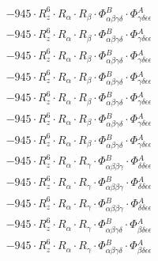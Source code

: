 \documentclass{article}
\begin{document}
\begin{subequations}
\begin{gather}
\begin{array}{c}
 \\[0.2em] 		 - 945 \cdot R_{z}^{6} \cdot R_{\alpha{}} \cdot R_{\beta{}} \cdot \Phi{}^{B}_{\alpha{}\beta{}\gamma{}\delta{}} \cdot \Phi{}^{A}_{\gamma{}\delta{}\epsilon{}\epsilon{}} 
 \\[0.2em] 		 - 945 \cdot R_{z}^{6} \cdot R_{\alpha{}} \cdot R_{\beta{}} \cdot \Phi{}^{B}_{\alpha{}\beta{}\gamma{}\delta{}} \cdot \Phi{}^{A}_{\gamma{}\delta{}\epsilon{}\epsilon{}} 
 \\[0.2em] 		 - 945 \cdot R_{z}^{6} \cdot R_{\alpha{}} \cdot R_{\beta{}} \cdot \Phi{}^{B}_{\alpha{}\beta{}\gamma{}\delta{}} \cdot \Phi{}^{A}_{\gamma{}\delta{}\epsilon{}\epsilon{}} 
 \\[0.2em] 		 - 945 \cdot R_{z}^{6} \cdot R_{\alpha{}} \cdot R_{\beta{}} \cdot \Phi{}^{B}_{\alpha{}\beta{}\gamma{}\delta{}} \cdot \Phi{}^{A}_{\gamma{}\delta{}\epsilon{}\epsilon{}} 
 \\[0.2em] 		 - 945 \cdot R_{z}^{6} \cdot R_{\alpha{}} \cdot R_{\beta{}} \cdot \Phi{}^{B}_{\alpha{}\beta{}\gamma{}\delta{}} \cdot \Phi{}^{A}_{\gamma{}\delta{}\epsilon{}\epsilon{}} 
 \\[0.2em] 		 - 945 \cdot R_{z}^{6} \cdot R_{\alpha{}} \cdot R_{\beta{}} \cdot \Phi{}^{B}_{\alpha{}\beta{}\gamma{}\delta{}} \cdot \Phi{}^{A}_{\gamma{}\delta{}\epsilon{}\epsilon{}} 
 \\[0.2em] 		 - 945 \cdot R_{z}^{6} \cdot R_{\alpha{}} \cdot R_{\beta{}} \cdot \Phi{}^{B}_{\alpha{}\beta{}\gamma{}\delta{}} \cdot \Phi{}^{A}_{\gamma{}\delta{}\epsilon{}\epsilon{}} 
 \\[0.2em] 		 - 945 \cdot R_{z}^{6} \cdot R_{\alpha{}} \cdot R_{\gamma{}} \cdot \Phi{}^{B}_{\alpha{}\beta{}\beta{}\gamma{}} \cdot \Phi{}^{A}_{\delta{}\delta{}\epsilon{}\epsilon{}} 
 \\[0.2em] 		 - 945 \cdot R_{z}^{6} \cdot R_{\alpha{}} \cdot R_{\gamma{}} \cdot \Phi{}^{B}_{\alpha{}\beta{}\beta{}\gamma{}} \cdot \Phi{}^{A}_{\delta{}\delta{}\epsilon{}\epsilon{}} 
 \\[0.2em] 		 - 945 \cdot R_{z}^{6} \cdot R_{\alpha{}} \cdot R_{\gamma{}} \cdot \Phi{}^{B}_{\alpha{}\beta{}\beta{}\gamma{}} \cdot \Phi{}^{A}_{\delta{}\delta{}\epsilon{}\epsilon{}} 
 \\[0.2em] 		 - 945 \cdot R_{z}^{6} \cdot R_{\alpha{}} \cdot R_{\gamma{}} \cdot \Phi{}^{B}_{\alpha{}\beta{}\gamma{}\delta{}} \cdot \Phi{}^{A}_{\beta{}\delta{}\epsilon{}\epsilon{}} 
 \\[0.2em] 		 - 945 \cdot R_{z}^{6} \cdot R_{\alpha{}} \cdot R_{\gamma{}} \cdot \Phi{}^{B}_{\alpha{}\beta{}\gamma{}\delta{}} \cdot \Phi{}^{A}_{\beta{}\delta{}\epsilon{}\epsilon{}} 

\end{array}
\end{gather}
\end{subequations}
\end{document}
